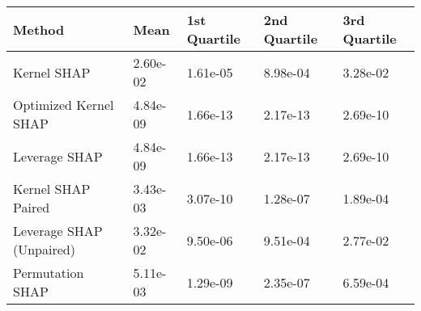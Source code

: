 \begin{tabular}{lllll}
  \toprule
  \textbf{Method} & \textbf{Mean} & \textbf{1st Quartile} & \textbf{2nd Quartile} & \textbf{3rd Quartile} \\ \midrule 
Kernel SHAP & 2.60e-02 & 1.61e-05 & 8.98e-04 & 3.28e-02\\
Optimized Kernel SHAP & \cellcolor{gold!60}4.84e-09 & \cellcolor{gold!60}1.66e-13 & \cellcolor{gold!60}2.17e-13 & \cellcolor{gold!60}2.69e-10\\
Leverage SHAP & \cellcolor{gold!60}4.84e-09 & \cellcolor{gold!60}1.66e-13 & \cellcolor{gold!60}2.17e-13 & \cellcolor{gold!60}2.69e-10\\
Kernel SHAP Paired & \cellcolor{bronze!60}3.43e-03 & \cellcolor{bronze!60}3.07e-10 & \cellcolor{bronze!60}1.28e-07 & \cellcolor{bronze!60}1.89e-04\\
Leverage SHAP (Unpaired) & 3.32e-02 & 9.50e-06 & 9.51e-04 & 2.77e-02\\
Permutation SHAP & 5.11e-03 & 1.29e-09 & 2.35e-07 & 6.59e-04\\
\bottomrule
\end{tabular}